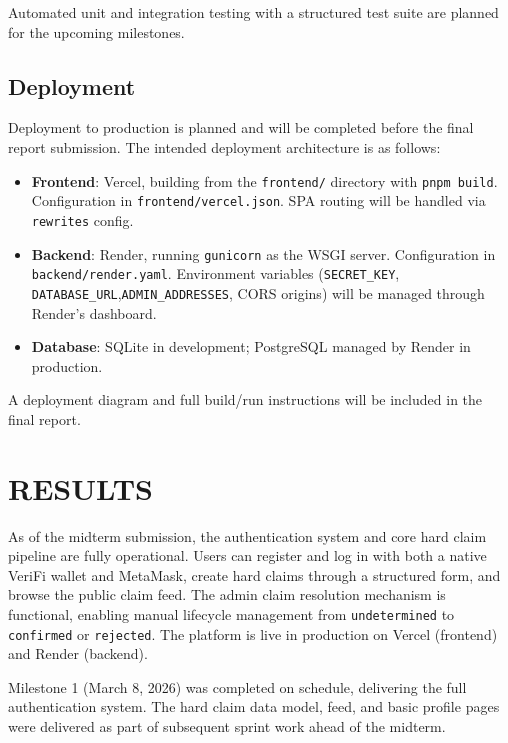 \documentclass[a4paper,12pt]{report}
\begin{document}
Automated unit and integration testing with a structured test suite are planned for the upcoming milestones.

\section{Deployment}

Deployment to production is planned and will be completed before the final report submission. The intended deployment architecture is as follows:

\begin{itemize}
    \item \textbf{Frontend}: Vercel, building from the \texttt{frontend/} directory with \texttt{pnpm build}. Configuration in \texttt{frontend/vercel.json}. SPA routing will be handled via \texttt{rewrites} config.
    \item \textbf{Backend}: Render, running \texttt{gunicorn} as the WSGI server. Configuration in \texttt{backend/render.yaml}. Environment variables (\texttt{SECRET\_KEY}, \texttt{DATABASE\_URL},\linebreak[4] \texttt{ADMIN\_ADDRESSES}, CORS origins) will be managed through Render's dashboard.
    \item \textbf{Database}: SQLite in development; PostgreSQL managed by Render in production.
\end{itemize}

A deployment diagram and full build/run instructions will be included in the final report.

\chapter{RESULTS}

As of the midterm submission, the authentication system and core hard claim pipeline are fully operational. Users can register and log in with both a native VeriFi wallet and MetaMask, create hard claims through a structured form, and browse the public claim feed. The admin claim resolution mechanism is functional, enabling manual lifecycle management from \texttt{undetermined} to \texttt{confirmed} or \texttt{rejected}. The platform is live in production on Vercel (frontend) and Render (backend).

Milestone 1 (March 8, 2026) was completed on schedule, delivering the full authentication system. The hard claim data model, feed, and basic profile pages were delivered as part of subsequent sprint work ahead of the midterm.
\end{document}
